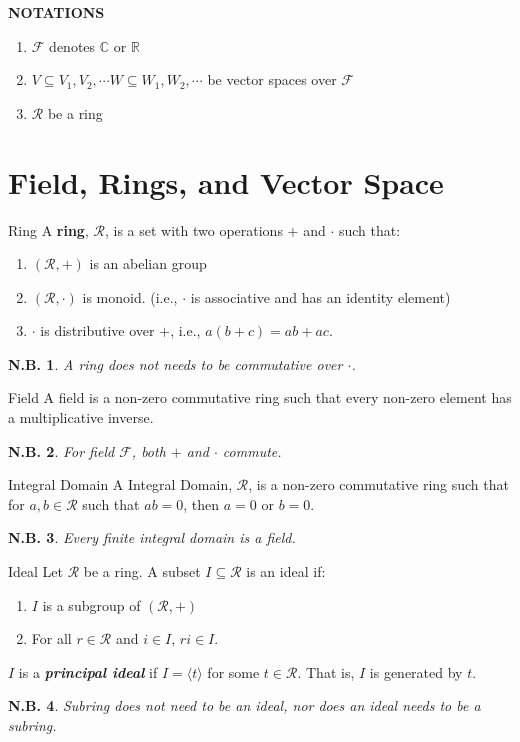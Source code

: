 \documentclass[12pt, a4paper]{article}
\newtheorem{note}{N.B.}[section]
\theoremstyle{remark}
\newcommand{\bb}[1]{\mathbb{#1}}
\newcommand{\mc}[1]{\mathcal{#1}}
\renewcommand{\emph}[1]{\textit{\textbf{#1}}}
\begin{document}
\textbf{NOTATIONS}
\begin{enumerate}
	\item $\mathcal{F}$ denotes $\bb{C}$ or $\bb{R}$
	\item $V \subseteq V_1, V_2, \cdots W \subseteq W_1, W_2, \cdots $ be vector spaces over $\mathcal{F}$
	\item $\mathcal{R}$ be a ring
\end{enumerate}

\section{Field, Rings, and Vector Space}
\begin{definition}{Ring}{}
	A \textbf{ring}, $\mathcal{R}$, is a set with two operations $+$ and $\cdot$ such that: 
	\begin{enumerate}
		\item $(\mathcal{R}, +)$ is an abelian group
		\item $(\mc{R},\cdot)$ is monoid. (i.e., $\cdot$ is associative and has an identity element) 
		\item $\cdot$ is distributive over $+$, i.e., $a(b+c) = ab + ac$.
	\end{enumerate}
\end{definition}
\begin{note}
	A ring does not needs to be commutative over $\cdot$. 
\end{note}

\begin{definition}{Field}{}
	A field is a non-zero commutative ring such that every non-zero element has a multiplicative inverse.
\end{definition}
\begin{note}
	For field $\mc{F}$, both $+$ and $\cdot$ commute. 
\end{note}

\begin{definition}{Integral Domain}{}
	A Integral Domain, $\mc{R}$, is a non-zero commutative ring such that for $a, b \in \mc{R}$ such that $ab = 0$, then $a = 0$ or $b = 0$.
\end{definition}
\begin{note}
	Every finite integral domain is a field.
\end{note}

\begin{definition}{Ideal}{}
	Let $\mc{R}$ be a ring. A subset $I \subseteq \mc{R}$ is an ideal if:
	\begin{enumerate}
		\item $I$ is a subgroup of $(\mc{R}, +)$
		\item For all $r \in \mc{R}$ and $i \in I$, $ri \in I$.
	\end{enumerate}

	$I$ is a \emph{principal ideal} if $I = \langle t \rangle$ for some $t \in \mc{R}$. That is, $I$ is generated by $t$.
\end{definition}
\begin{note}
	Subring does not need to be an ideal, nor does an ideal needs to be a subring.
\end{note}
\end{document}
